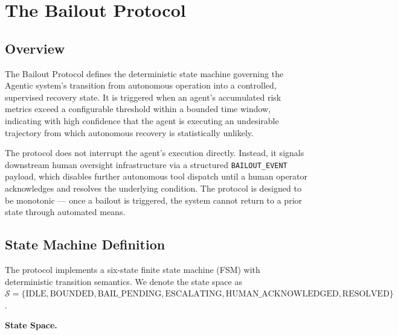 \section{The Bailout Protocol}

\subsection{Overview}
The Bailout Protocol defines the deterministic state machine governing the Agentic system's transition from autonomous operation into a controlled, supervised recovery state. It is triggered when an agent's accumulated risk metrics exceed a configurable threshold within a bounded time window, indicating with high confidence that the agent is executing an undesirable trajectory from which autonomous recovery is statistically unlikely.

The protocol does not interrupt the agent's execution directly. Instead, it signals downstream human oversight infrastructure via a structured \texttt{BAILOUT\_EVENT} payload, which disables further autonomous tool dispatch until a human operator acknowledges and resolves the underlying condition. The protocol is designed to be monotonic — once a bailout is triggered, the system cannot return to a prior state through automated means.

\bigskip

\subsection{State Machine Definition}

The protocol implements a six-state finite state machine (FSM) with deterministic transition semantics. We denote the state space as $\mathcal{S} = \{\text{IDLE}, \text{BOUNDED}, \text{BAIL\_PENDING}, \text{ESCALATING}, \text{HUMAN\_ACKNOWLEDGED}, \text{RESOLVED}\}$.

\bigskip

\noindent\textbf{State Space.}

